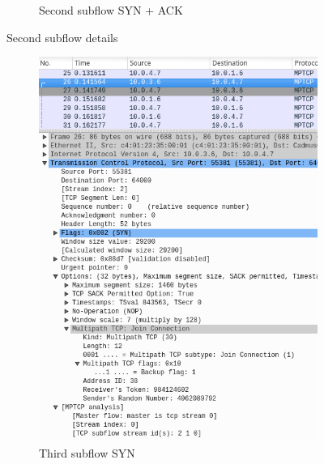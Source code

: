 \documentclass[a4paper,11pt]{article}
\begin{document}
\begin{figure}[h!]
\begin{subfigure}{.5\textwidth}
			  \caption{Second subflow SYN + ACK}
			\end{subfigure}
			\caption{Second subflow details}
			\end{figure}

			
			\begin{figure}[h!]
			\centering
			\label{fig:thirdsubflow}
			\begin{subfigure}{.5\textwidth}
			  \centering
			  \label{fig:secondflow}
			  \includegraphics[width=.8\linewidth]{pictures/thirdflow.jpg}
			  \caption{Third subflow SYN}
			\end{subfigure}%
			\begin{subfigure}{.5\textwidth}
			  \centering
			  \label{fig:thirdflowresponse}

\end{subfigure}
\end{figure}
\end{document}
